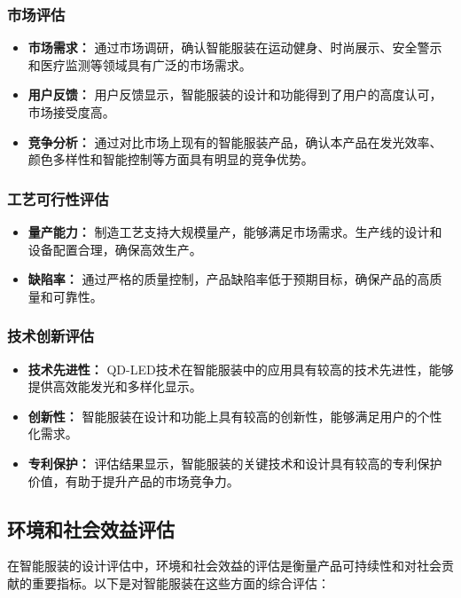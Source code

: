\documentclass[12pt,hyperref,a4paper,UTF8]{ctexart}
\begin{document}
\subsubsection*{市场评估}
\begin{itemize}
  \item \textbf{市场需求：} 通过市场调研，确认智能服装在运动健身、时尚展示、安全警示和医疗监测等领域具有广泛的市场需求。
  \item \textbf{用户反馈：} 用户反馈显示，智能服装的设计和功能得到了用户的高度认可，市场接受度高。
  \item \textbf{竞争分析：} 通过对比市场上现有的智能服装产品，确认本产品在发光效率、颜色多样性和智能控制等方面具有明显的竞争优势。
\end{itemize}

\subsubsection*{工艺可行性评估}
\begin{itemize}
  \item \textbf{量产能力：} 制造工艺支持大规模量产，能够满足市场需求。生产线的设计和设备配置合理，确保高效生产。
  \item \textbf{缺陷率：} 通过严格的质量控制，产品缺陷率低于预期目标，确保产品的高质量和可靠性。
\end{itemize}


\subsubsection*{技术创新评估}
\begin{itemize}
  \item \textbf{技术先进性：} QD-LED技术在智能服装中的应用具有较高的技术先进性，能够提供高效能发光和多样化显示。
  \item \textbf{创新性：} 智能服装在设计和功能上具有较高的创新性，能够满足用户的个性化需求。
  \item \textbf{专利保护：} 评估结果显示，智能服装的关键技术和设计具有较高的专利保护价值，有助于提升产品的市场竞争力。
\end{itemize}

\subsection{环境和社会效益评估}
在智能服装的设计评估中，环境和社会效益的评估是衡量产品可持续性和对社会贡献的重要指标。以下是对智能服装在这些方面的综合评估：
\end{document}
